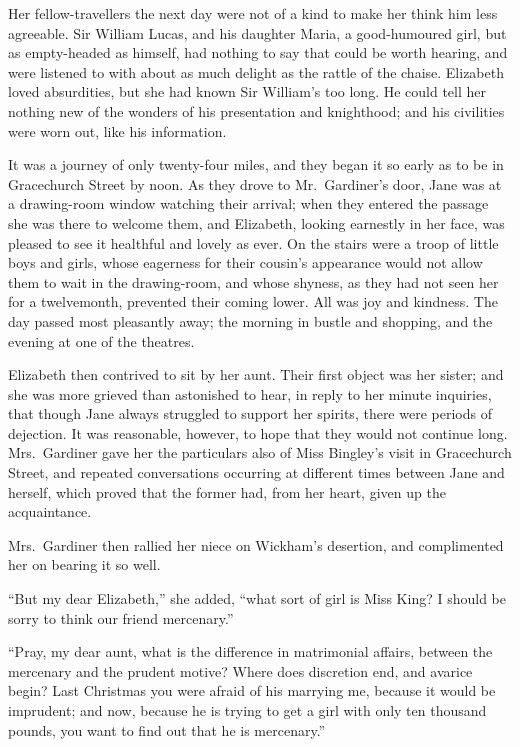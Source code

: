 \documentclass[12pt,english,oneside]{book}
\begin{document}
Her fellow-travellers the next day were not of a kind to make her
think him less agreeable. Sir William Lucas, and his daughter Maria,
a good-humoured girl, but as empty-headed as himself, had nothing
to say that could be worth hearing, and were listened to with about
as much delight as the rattle of the chaise. Elizabeth loved absurdities,
but she had known Sir William's too long. He could tell her nothing
new of the wonders of his presentation and knighthood; and his civilities
were worn out, like his information.

It was a journey of only twenty-four miles, and they began it so early
as to be in Gracechurch Street by noon. As they drove to Mr.\ Gardiner's
door, Jane was at a drawing-room window watching their arrival; when
they entered the passage she was there to welcome them, and Elizabeth,
looking earnestly in her face, was pleased to see it healthful and
lovely as ever. On the stairs were a troop of little boys and girls,
whose eagerness for their cousin's appearance would not allow them
to wait in the drawing-room, and whose shyness, as they had not seen
her for a twelvemonth, prevented their coming lower. All was joy and
kindness. The day passed most pleasantly away; the morning in bustle
and shopping, and the evening at one of the theatres.

Elizabeth then contrived to sit by her aunt. Their first object was
her sister; and she was more grieved than astonished to hear, in reply
to her minute inquiries, that though Jane always struggled to support
her spirits, there were periods of dejection. It was reasonable, however,
to hope that they would not continue long. Mrs.\ Gardiner gave her
the particulars also of Miss Bingley's visit in Gracechurch Street,
and repeated conversations occurring at different times between Jane
and herself, which proved that the former had, from her heart, given
up the acquaintance.

Mrs.\ Gardiner then rallied her niece on Wickham's desertion, and
complimented her on bearing it so well.

{}``But my dear Elizabeth,'' she added, {}``what sort of girl is
Miss King? I should be sorry to think our friend mercenary.''

{}``Pray, my dear aunt, what is the difference in matrimonial affairs,
between the mercenary and the prudent motive? Where does discretion
end, and avarice begin? Last Christmas you were afraid of his marrying
me, because it would be imprudent; and now, because he is trying to
get a girl with only ten thousand pounds, you want to find out that
he is mercenary.''
\end{document}
